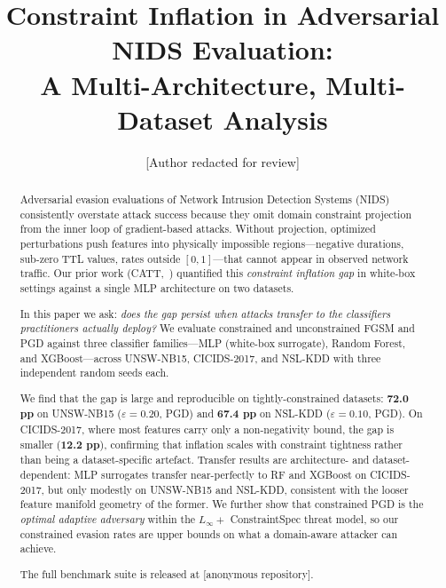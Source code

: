 \documentclass[sigconf,anonymous=true]{acmart}
\begin{document}
\title{Constraint Inflation in Adversarial NIDS Evaluation:\\
       A Multi-Architecture, Multi-Dataset Analysis}

\author{[Author redacted for review]}
\email{[redacted]}

\begin{abstract}
Adversarial evasion evaluations of Network Intrusion Detection Systems
(NIDS) consistently overstate attack success because they omit domain
constraint projection from the inner loop of gradient-based attacks.
Without projection, optimized perturbations push features into physically
impossible regions---negative durations, sub-zero TTL values, rates
outside $[0,1]$---that cannot appear in observed network traffic.
Our prior work (CATT,~\cite{sasso2026catt}) quantified this
\emph{constraint inflation gap} in white-box settings against a single
MLP architecture on two datasets.

In this paper we ask: \emph{does the gap persist when attacks transfer
to the classifiers practitioners actually deploy?}
We evaluate constrained and unconstrained FGSM and PGD against three
classifier families---MLP (white-box surrogate), Random Forest, and
XGBoost---across UNSW-NB15, CICIDS-2017, and NSL-KDD with three
independent random seeds each.

We find that the gap is large and reproducible on tightly-constrained
datasets: \textbf{72.0 pp} on UNSW-NB15 ($\varepsilon=0.20$, PGD) and
\textbf{67.4 pp} on NSL-KDD ($\varepsilon=0.10$, PGD).
On CICIDS-2017, where most features carry only a non-negativity bound,
the gap is smaller (\textbf{12.2 pp}), confirming that inflation scales
with constraint tightness rather than being a dataset-specific artefact.
Transfer results are architecture- and dataset-dependent: MLP surrogates
transfer near-perfectly to RF and XGBoost on CICIDS-2017, but only
modestly on UNSW-NB15 and NSL-KDD, consistent with the looser feature
manifold geometry of the former.
We further show that constrained PGD is the \emph{optimal adaptive
adversary} within the $L_\infty +$ ConstraintSpec threat model, so our
constrained evasion rates are upper bounds on what a domain-aware
attacker can achieve.

The full benchmark suite is released at [anonymous repository].
\end{abstract}

\end{document}
